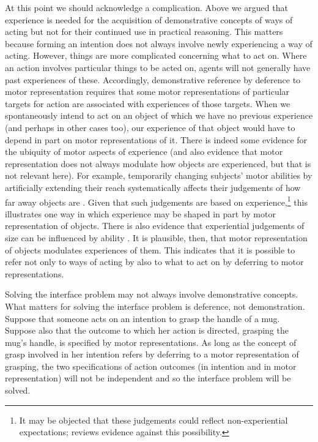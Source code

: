\documentclass[12pt,\papersize]{extarticle}
\begin{document}
At this point we should acknowledge a complication.  Above we argued that experience is needed for the acquisition of demonstrative concepts of ways of acting but not for their continued use in practical reasoning.  This matters because forming an intention does not always involve newly experiencing a way of acting. However, things are more complicated concerning what to act on. Where an action involves particular things to be acted on, agents will not generally have past experiences of these.  Accordingly, demonstrative reference by deference to motor representation requires that some motor representations of particular targets for action are associated with experiences of those targets.  When we spontaneously intend to act on an object of which we have no previous experience (and perhaps in other cases too), our experience of that object would have to depend in part on motor representations of it.  There is indeed some evidence for the ubiquity of motor aspects of experience (and also evidence that motor representation does not always modulate how objects are experienced, but that is not relevant here).  For example, temporarily changing subjects' motor abilities by artificially extending their reach systematically affects their judgements of how far away objects are \citep{linkenauger:2009_effects, costantini2011tool}. Given that such judgements are based on experience,\footnote{
It may be objected that these judgements could reflect non-experiential expectations; \citet[pp.\ 203-4]{witt:2011_action} reviews evidence against this possibility.
} 
this illustrates one way in which experience may be shaped in part by motor representation of objects.  There is also evidence that experiential judgements of size can be influenced by ability \citep[e.g.][]{witt2009kicking}.  It is plausible, then, that motor representation of objects modulates experiences of them.  This indicates that it is possible to refer not only to ways of acting by also to what to act on by deferring to motor representations.

Solving the interface problem may not always involve demonstrative concepts. What matters for solving the interface problem is deference, not demonstration. Suppose that someone acts on an intention to grasp the handle of a mug.  Suppose also that the outcome to which her action is directed, grasping the mug's handle, is specified by motor representations. As long as the concept of grasp involved in her intention refers by deferring to a motor representation of grasping, the two specifications of action outcomes (in intention and in motor representation) will not be independent and so the interface problem will be solved.
\end{document}
